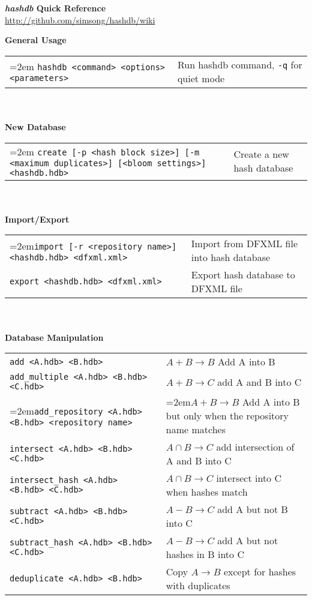 \documentclass[12pt]{article}
\newcommand{\hdb}{\emph{hashdb}\xspace}
\begin{document}
\begin{center}
\textbf{\Large \hdb Quick Reference} \\
\url{http://github.com/simsong/hashdb/wiki}
\end{center}

\textbf{General Usage} \\
\begin{tabular}{p{3.6 in} p{4 in}}
\hangindent=2em \small\texttt{hashdb <command> <options> <parameters>} & Run hashdb command, \texttt{-q} for quiet mode \\
\end{tabular}
\\
\\
\textbf{New Database} \\
\begin{tabular}{p{3.6 in} p{4 in}}
\hangindent=2em \small\texttt{create [-p <hash block size>] [-m <maximum duplicates>] [<bloom settings>] <hashdb.hdb>} &
Create a new hash database \\
\end{tabular}
\\
\\
\textbf{Import/Export} \\
\begin{tabular}{p{3.6 in} p{4 in}}
\hangindent=2em\small\texttt{import [-r <repository name>] <hashdb.hdb> <dfxml.xml>} &
Import from DFXML file into hash database \\
\small\texttt{export <hashdb.hdb> <dfxml.xml>} &
Export hash database to DFXML file \\
\end{tabular}
\\
\\
\textbf{Database Manipulation} \\
\begin{tabular}{p{3.6 in} p{3.4 in}}
\small\texttt{add <A.hdb> <B.hdb>} & $A + B \rightarrow B$ Add A into B \\
\small\texttt{add\_multiple <A.hdb> <B.hdb> <C.hdb>} & $A + B \rightarrow C$ add A and B into C\\
\hangindent=2em\small\texttt{add\_repository <A.hdb> <B.hdb> <repository name>} & \hangindent=2em$A + B \rightarrow B$ Add A into B but only when the repository name matches \\
\small\texttt{intersect <A.hdb> <B.hdb> <C.hdb>} & $A \cap B \rightarrow C$ add intersection of A and B into C\\
\small\texttt{intersect\_hash <A.hdb> <B.hdb> <C.hdb>} & $A \cap B \rightarrow C$ intersect into C when hashes match\\
\small\texttt{subtract <A.hdb> <B.hdb> <C.hdb>} & $A - B \rightarrow C$ add A but not B into C\\
\small\texttt{subtract\_hash <A.hdb> <B.hdb> <C.hdb>} & $A - B \rightarrow C$ add A but not hashes in B into C\\
\small\texttt{deduplicate <A.hdb> <B.hdb>} & Copy $A \rightarrow B$ except for hashes with duplicates \\
\end{tabular}
\end{document}
